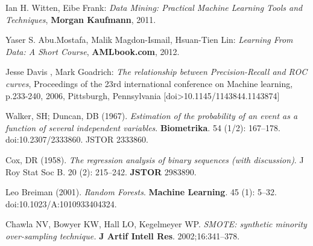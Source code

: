 \begin{thebibliography}{9}
Ian H. Witten, Eibe Frank: \textit{Data Mining: Practical Machine Learning Tools and Techniques}, \textbf{Morgan Kaufmann}, 2011.

Yaser S. Abu.Mostafa, Malik Magdon-Ismail, Hsuan-Tien Lin: \textit{Learning From Data: A Short Course}, \textbf{AMLbook.com}, 2012.

Jesse Davis , Mark Goadrich: \textit{The relationship between Precision-Recall and ROC curves}, Proceedings of the 23rd international conference on Machine learning, p.233-240, 2006, Pittsburgh, Pennsylvania  [doi>10.1145/1143844.1143874] 

Walker, SH; Duncan, DB (1967). \textit{Estimation of the probability of an event as a function of several independent variables}. \textbf{Biometrika}. 54 (1/2): 167–178. doi:10.2307/2333860. JSTOR 2333860.

Cox, DR (1958). \textit{The regression analysis of binary sequences (with discussion)}. J Roy Stat Soc B. 20 (2): 215–242. \textbf{JSTOR} 2983890. 

Leo Breiman (2001). \textit{Random Forests}. \textbf{Machine Learning}. 45 (1): 5–32. doi:10.1023/A:1010933404324. 

Chawla NV, Bowyer KW, Hall LO, Kegelmeyer WP. \textit{SMOTE: synthetic minority over-sampling technique.} \textbf{J Artif Intell Res}. 2002;16:341–378.

\end{thebibliography}